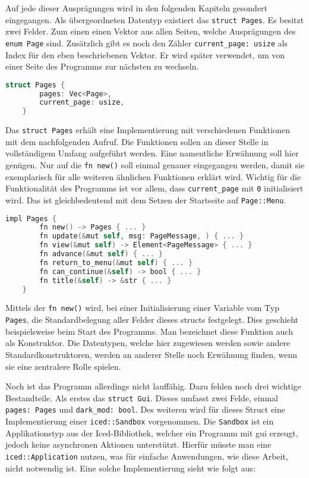 Auf jede dieser Ausprägungen wird in den folgenden Kapiteln gesondert eingegangen.
Als übergeordneten Datentyp existiert das \lstinline{struct Pages}. 
Es besitzt zwei Felder. Zum einen einen Vektor aus allen Seiten, welche Ausprägungen des \lstinline{enum Page} sind.
Zusätzlich gibt es noch den Zähler  \lstinline{current_page: usize} als Index für den eben beschriebenen Vektor. Er wird später verwendet, um
von einer Seite des Programms zur nächsten zu wechseln.

\begin{lstlisting}[language=C]
    struct Pages {
        pages: Vec<Page>,
        current_page: usize,
    }
\end{lstlisting}

Das \lstinline{struct Pages} erhält eine Implementierung mit verschiedenen Funktionen mit dem nachfolgenden Aufruf.
Die Funktionen sollen an dieser Stelle in vollständigem Umfang aufgeführt werden. Eine namentliche Erwähnung soll hier genügen. 
Nur auf die \lstinline{fn new()} soll einmal genauer eingegangen werden, damit sie exemplarisch für alle weiteren ähnlichen Funktionen erklärt wird.
Wichtig für die Funktionalität des Programms ist vor allem, dass \lstinline{current_page} mit \lstinline{0} initialisiert wird. Das ist gleichbedeutend mit dem Setzen der 
Startseite auf \lstinline{Page::Menu}.

\begin{lstlisting}[language=C]
    impl Pages {
        fn new() -> Pages { ... }
        fn update(&mut self, msg: PageMessage, ) { ... }
        fn view(&mut self) -> Element<PageMessage> { ... }
        fn advance(&mut self) { ... }
        fn return_to_menu(&mut self) { ... }
        fn can_continue(&self) -> bool { ... }
        fn title(&self) -> &str { ... }
    }
\end{lstlisting}

Mittels der \lstinline{fn new()} wird, bei einer Initialisierung einer Variable vom Typ \lstinline{Pages}, die Standardbelegung aller Felder dieses structs festgelegt. 
Dies geschieht beispielsweise beim Start des Programms. Man bezeichnet diese Funktion auch als Konstruktor. Die Datentypen, welche hier zugewiesen werden sowie andere Standardkonstruktoren,
werden an anderer Stelle noch Erwähnung finden, wenn sie eine zentralere Rolle spielen.

Noch ist das Programm allerdings nicht lauffähig. Dazu fehlen noch drei wichtige Bestandteile. Als erstes das \lstinline{struct Gui}. Dieses umfasst zwei Felde, einmal 
\lstinline{pages: Pages} und \lstinline{dark_mod: bool}. Des weiteren wird für dieses Struct eine Implementierung einer \lstinline{iced::Sandbox} vorgenommen.
Die \lstinline{Sandbox} ist ein Applikationstyp aus der Iced-Bibliothek, welcher ein Programm mit \ac{gui} erzeugt, jedoch keine asynchronen Aktionen unterstützt. Hierfür müsste man
eine \lstinline{iced::Application} nutzen, was für einfache Anwendungen, wie diese Arbeit, nicht notwendig ist. Eine solche Implementierung sieht wie folgt aus:


